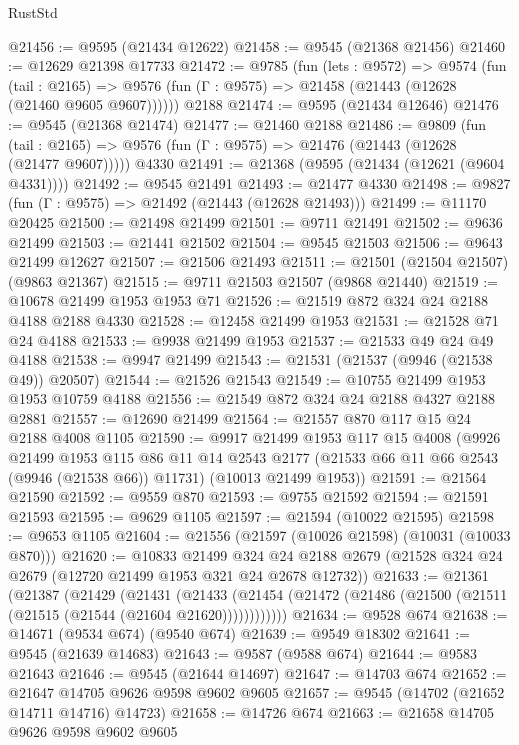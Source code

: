 \begin{lexlean}{RustStd}
\begin{coremodule}
@21456 := @9595 (@21434 @12622)
@21458 := @9545 (@21368 @21456)
@21460 := @12629 @21398 @17733
@21472 := @9785
    (fun (lets : @9572) =>
    @9574
      (fun (tail : @2165) =>
      @9576 (fun (Γ : @9575) => @21458 (@21443 (@12628 (@21460 @9605 @9607))))))
    @2188
@21474 := @9595 (@21434 @12646)
@21476 := @9545 (@21368 @21474)
@21477 := @21460 @2188
@21486 := @9809
    (fun (tail : @2165) => @9576 (fun (Γ : @9575) => @21476 (@21443 (@12628 (@21477 @9607)))))
    @4330
@21491 := @21368 (@9595 (@21434 (@12621 (@9604 @4331))))
@21492 := @9545 @21491
@21493 := @21477 @4330
@21498 := @9827 (fun (Γ : @9575) => @21492 (@21443 (@12628 @21493)))
@21499 := @11170 @20425
@21500 := @21498 @21499
@21501 := @9711 @21491
@21502 := @9636 @21499
@21503 := @21441 @21502
@21504 := @9545 @21503
@21506 := @9643 @21499 @12627
@21507 := @21506 @21493
@21511 := @21501 (@21504 @21507) (@9863 @21367)
@21515 := @9711 @21503 @21507 (@9868 @21440)
@21519 := @10678 @21499 @1953 @1953 @71
@21526 := @21519 @872 @324 @24 @2188 @4188 @2188 @4330
@21528 := @12458 @21499 @1953
@21531 := @21528 @71 @24 @4188
@21533 := @9938 @21499 @1953
@21537 := @21533 @49 @24 @49 @4188
@21538 := @9947 @21499
@21543 := @21531 (@21537 (@9946 (@21538 @49)) @20507)
@21544 := @21526 @21543
@21549 := @10755 @21499 @1953 @1953 @10759 @4188
@21556 := @21549 @872 @324 @24 @2188 @4327 @2188 @2881
@21557 := @12690 @21499
@21564 := @21557 @870 @117 @15 @24 @2188 @4008 @1105
@21590 := @9917
    @21499
    @1953
    @117
    @15
    @4008
    (@9926
      @21499
      @1953
      @115
      @86
      @11
      @14
      @2543
      @2177
      (@21533 @66 @11 @66 @2543 (@9946 (@21538 @66)) @11731)
      (@10013 @21499 @1953))
@21591 := @21564 @21590
@21592 := @9559 @870
@21593 := @9755 @21592
@21594 := @21591 @21593
@21595 := @9629 @1105
@21597 := @21594 (@10022 @21595)
@21598 := @9653 @1105
@21604 := @21556 (@21597 (@10026 @21598) (@10031 (@10033 @870)))
@21620 := @10833
    @21499
    @324
    @24
    @2188
    @2679
    (@21528 @324 @24 @2679 (@12720 @21499 @1953 @321 @24 @2678 @12732))
@21633 := @21361
    (@21387
      (@21429
        (@21431
          (@21433 (@21454 (@21472 (@21486 (@21500 (@21511 (@21515 (@21544 (@21604 @21620))))))))))))
@21634 := @9528 @674
@21638 := @14671 (@9534 @674) (@9540 @674)
@21639 := @9549 @18302
@21641 := @9545 (@21639 @14683)
@21643 := @9587 (@9588 @674)
@21644 := @9583 @21643
@21646 := @9545 (@21644 @14697)
@21647 := @14703 @674
@21652 := @21647 @14705 @9626 @9598 @9602 @9605
@21657 := @9545 (@14702 (@21652 @14711 @14716) @14723)
@21658 := @14726 @674
@21663 := @21658 @14705 @9626 @9598 @9602 @9605

\end{coremodule}
\end{lexlean}
